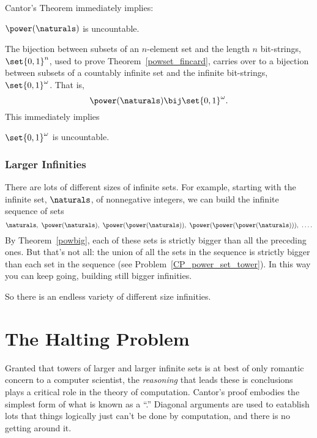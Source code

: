 Cantor's Theorem immediately implies:

\begin{corollary}
$\power(\naturals)$ is uncountable.
\end{corollary}

The bijection between subsets of an $n$-element set and the length $n$
bit-strings, $\set{0,1}^n$, used to prove Theorem~\ref{powset_fincard},
carries over to a bijection between subsets of a countably infinite
set and the infinite bit-strings, $\set{0,1}^{\omega}$.  That is,
\[
\power(\naturals) \bij \set{0,1}^{\omega}.
\]
This immediately implies
\begin{corollary}
$\set{0,1}^{\omega}$ is uncountable.
\end{corollary}

\subsubsection{Larger Infinities}

There are lots of different sizes of infinite sets.  For example, starting
with the infinite set, $\naturals$, of nonnegative integers, we can build
the infinite sequence of sets
\[
\naturals,\ \power(\naturals),\ \power(\power(\naturals)),\
\power(\power(\power(\naturals))),\ \dots.
\]
By Theorem~\ref{powbig}, each of these sets is strictly bigger than all
the preceding ones.  But that's not all: the union of all the sets in the
sequence is strictly bigger than each set in the sequence
(see Problem~\ref{CP_power_set_tower}).  In this way you can keep going,
building still bigger infinities.

So there is an endless variety of different size infinities.

\section{The Halting Problem}\label{halting_sec}

Granted that towers of larger and larger infinite sets is at best of only
romantic concern to a computer scientist, the \emph{reasoning} that leads
these is conclusions plays a critical role in the theory of computation.
Cantor's proof embodies the simplest form of what is known as a
``.''  Diagonal arguments are used to eatablish
lots that things logically just can't be done by computation, and there is
no getting around it.

